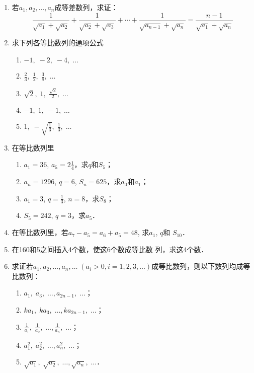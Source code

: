 \begin{enumerate}
\item 若$a_1,a_2,\ldots,a_n$成等差数列，求证：
\[\frac{1}{\sqrt{a_1}+\sqrt{a_2}}+\frac{1}{\sqrt{a_2}+\sqrt{a_3}}+\cdots +\frac{1}{\sqrt{a_{n-1}}+\sqrt{a_n}}=\frac{n-1}{\sqrt{a_1}+\sqrt{a_n}}\]

\item 求下列各等比数列的通项公式
\begin{multicols}{2}
\begin{enumerate}
    \item $-1,\;-2,\;-4,\;\ldots$
    \item $\frac{2}{3},\;\frac{1}{2},\;\frac{3}{8},\;\ldots$
    \item $\sqrt{2},\;1,\;\frac{\sqrt{2}}{2},\;\ldots$
    \item $-1,\;1,\;-1,\;\ldots$
    \item $1,\;-\sqrt{\frac{1}{3}},\;\frac{1}{3},\;\ldots$
\end{enumerate}
\end{multicols}

\item 在等比数列里
\begin{enumerate}
    \item $a_1=36$, $a_5=2\frac{1}{4}$，求$q$和$S_5$；
    \item $a_n=1296$, $q=6$, $S_n=625$，求$a_0$和$a_1$；
    \item $a_1=3$, $q=\frac{1}{3}$, $n=8$，求$S_8$；
    \item $S_5=242$, $q=3$，求$a_5$．
\end{enumerate}
\item 在等比数列里，若$a_7-a_5=a_6+a_5=48$, 求$a_1$, $q$和
$S_{10}$．
\item 在160和5之间插入4个数，使这6个数成等比数
列，求这4个数．
\item 求证若$a_1,a_2,\ldots,a_n,\ldots\; (a_i>0,i=1,2,3,
\ldots)$成等比数列，则以下数列均成等比数列：
\begin{multicols}{2}
\begin{enumerate}
    \item $a_1,\; a_3,\; \ldots, a_{2n-1},\; \ldots$；
    \item $ka_1,\; ka_3,\; \ldots, ka_{2n-1},\; \ldots$；
    \item $\frac{1}{a_1},\; \frac{1}{a_2},\; \ldots, \frac{1}{a_{n}},\; \ldots$；
    \item $a^2_1,\; a^2_2,\; \ldots, a^2_{n},\; \ldots$；
    \item $\sqrt{a_1},\; \sqrt{a_2},\; \ldots, \sqrt{a_n},\; \ldots$．
\end{enumerate}
\end{multicols}


\end{enumerate}
